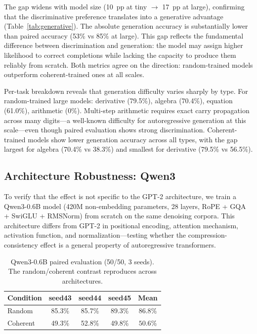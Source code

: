 \documentclass{article}
\begin{document}
The gap widens with model size (10~pp at tiny $\to$ 17~pp at large), confirming that the discriminative preference translates into a generative advantage (Table~\ref{tab:generative}). The absolute generation accuracy is substantially lower than paired accuracy (53\% vs 85\% at large). This gap reflects the fundamental difference between discrimination and generation: the model may assign higher likelihood to correct completions while lacking the capacity to produce them reliably from scratch. Both metrics agree on the direction: random-trained models outperform coherent-trained ones at all scales.

Per-task breakdown reveals that generation difficulty varies sharply by type. For random-trained large models: derivative (79.5\%), algebra (70.4\%), equation (61.0\%), arithmetic (0\%). Multi-step arithmetic requires exact carry propagation across many digits---a well-known difficulty for autoregressive generation at this scale---even though paired evaluation shows strong discrimination. Coherent-trained models show lower generation accuracy across all types, with the gap largest for algebra (70.4\% vs 38.3\%) and smallest for derivative (79.5\% vs 56.5\%).

\subsection{Architecture Robustness: Qwen3}
\label{sec:qwen}

To verify that the effect is not specific to the GPT-2 architecture, we train a Qwen3-0.6B model (420M non-embedding parameters, 28 layers, RoPE + GQA + SwiGLU + RMSNorm) from scratch on the same denoising corpora. This architecture differs from GPT-2 in positional encoding, attention mechanism, activation function, and normalization---testing whether the compression-consistency effect is a general property of autoregressive transformers.

\begin{table}[t]
\centering
\begin{tabular}{lcccc}
\toprule
Condition & seed43 & seed44 & seed45 & Mean \\
\midrule
Random   & 85.3\% & 85.7\% & 89.3\% & $\mathbf{86.8\%}$ \\
Coherent & 49.3\% & 52.8\% & 49.8\% & $\mathbf{50.6\%}$ \\
\bottomrule
\end{tabular}
\caption{Qwen3-0.6B paired evaluation (50/50, 3 seeds). The random/coherent contrast reproduces across architectures.}
\label{tab:qwen}
\end{table}
\end{document}
